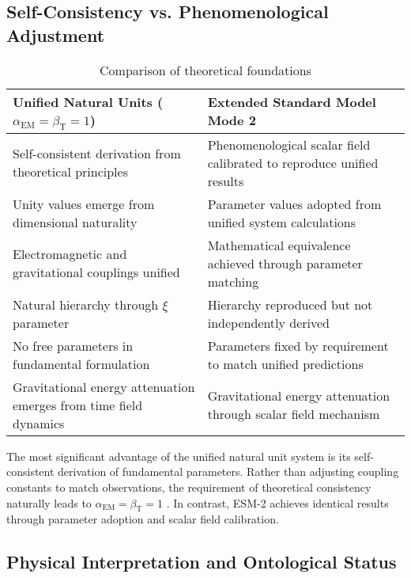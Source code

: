 \documentclass[12pt,a4paper]{article}
\newcommand{\alphaEM}{\alpha_{\text{EM}}}
\newcommand{\betaT}{\beta_{\text{T}}}
\newcommand{\xipar}{\xi}
\begin{document}
	\subsection{Self-Consistency vs. Phenomenological Adjustment}
	\label{subsec:self_consistency_comparison}
	
	\begin{table}[ht]
		\centering
		\caption{Comparison of theoretical foundations}
		\label{tab:theoretical_foundations}
		\begin{tabular}{p{}|p{}}
			\hline
			\textbf{Unified Natural Units ($\alphaEM = \betaT = 1$)} & \textbf{Extended Standard Model Mode 2} \\
			\hline
			Self-consistent derivation from theoretical principles \cite{pascher_unified_2025} & Phenomenological scalar field calibrated to reproduce unified results \\
			\hline
			Unity values emerge from dimensional naturality & Parameter values adopted from unified system calculations \\
			\hline
			Electromagnetic and gravitational couplings unified & Mathematical equivalence achieved through parameter matching \\
			\hline
			Natural hierarchy through $\xipar$ parameter \cite{pascher_beta_derivation_2025} & Hierarchy reproduced but not independently derived \\
			\hline
			No free parameters in fundamental formulation & Parameters fixed by requirement to match unified predictions \\
			\hline
			Gravitational energy attenuation emerges from time field dynamics & Gravitational energy attenuation through scalar field mechanism \\
			\hline
		\end{tabular}
	\end{table}
	
	The most significant advantage of the unified natural unit system is its self-consistent derivation of fundamental parameters. Rather than adjusting coupling constants to match observations, the requirement of theoretical consistency naturally leads to $\alphaEM = \betaT = 1$ \cite{pascher_unified_2025}. In contrast, ESM-2 achieves identical results through parameter adoption and scalar field calibration.
	
	\subsection{Physical Interpretation and Ontological Status}
	\label{subsec:physical_interpretation_ontological}
	
\end{document}
